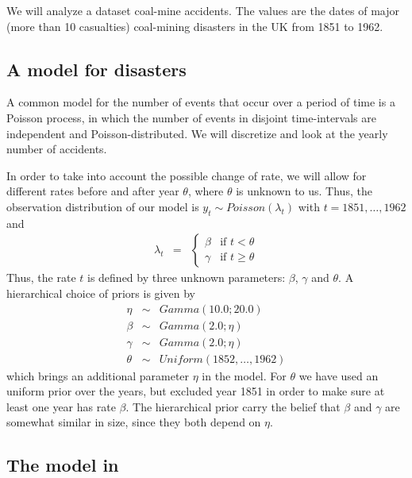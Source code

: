 \documentclass[11pt]{article}
\begin{document}
We will analyze a dataset coal-mine accidents.
The values are the dates of major (more than 10 casualties) coal-mining disasters in the UK from 1851 to 1962. 


\subsection*{A model for disasters}

A common model for the number of events that occur over a period of time is a Poisson process, in which the number of events in disjoint time-intervals are independent and Poisson-distributed. 
We will discretize and look at the yearly number of accidents. 

In order to take into account the possible change of rate, we will allow for different rates before and after year $\theta$, where $\theta$ is unknown to us. 
Thus, the observation distribution of our model is 
$y_t \sim Poisson(\lambda_t)$ with $t = 1851,\ldots,1962$ and
\begin{eqnarray*}
\lambda_t & = & \begin{cases}
\beta & \mbox{if } t < \theta \\
\gamma & \mbox{if } t \geq \theta
\end{cases}
\end{eqnarray*}
Thus, the rate $t$ is defined by three unknown parameters: $\beta$, $\gamma$ and $\theta$. A hierarchical choice of priors is given by
\begin{eqnarray*}
 \eta & \sim & Gamma(10.0;20.0) \\ 
 \beta & \sim & Gamma(2.0;\eta) \\
 \gamma & \sim &Gamma(2.0;\eta) \\
 \theta & \sim & Uniform(1852,\ldots,1962)
\end{eqnarray*}
which brings an additional parameter $\eta$ in the model. 
For $\theta$ we have used an uniform prior over the years, but excluded year 1851 in order to make sure at least one year has rate $\beta$. 
The hierarchical prior carry the belief that $\beta$ and $\gamma$ are somewhat similar in size,
since they both depend on $\eta$. 

\subsection*{The model in \Rev}
\end{document}
